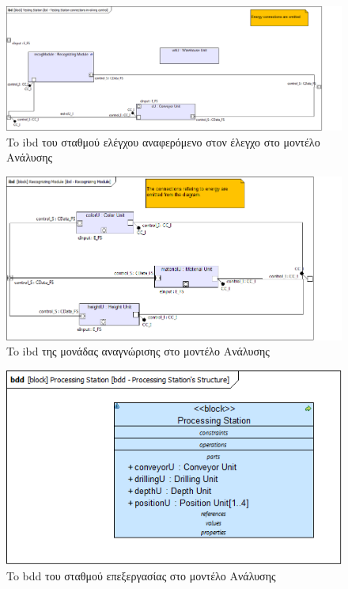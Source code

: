 \documentclass[a4paper,12pt,twoside]{report}
\begin{document}
{\begin{appendices}
			\begin{figure}[hp]
					\centering
					\includegraphics[scale=0.30]{AnalysisModel_ibd-TestingStationconnectionsinvolvingcontrol.png}
					\caption{To ibd του σταθμού ελέγχου αναφερόμενο στον έλεγχο στο μοντέλο Ανάλυσης}
					\label{φωτ:To ibd του σταθμού ελέγχου αναφερόμενο στον έλεγχο στο μοντέλο Ανάλυσης}
			\end{figure}
			
			\begin{figure}[hp]
					\centering
					\includegraphics[scale=0.30]{AnalysisModel_ibd-RecognizingModule.png}
					\caption{To ibd της μονάδας αναγνώρισης στο μοντέλο Ανάλυσης}
					\label{φωτ:To ibd της μονάδας αναγνώρισης στο μοντέλο Ανάλυσης}
			\end{figure}
			
			\begin{figure}[hp]
					\centering
					\includegraphics[scale=0.30]{AnalysisModel_bdd-ProcessingStationsStructure.png}
					\caption{To bdd του σταθμού επεξεργασίας στο μοντέλο Ανάλυσης}
					\label{φωτ:To bdd του σταθμού επεξεργασίας στο μοντέλο Ανάλυσης}
			\end{figure}
			

\end{appendices}}
\end{document}
